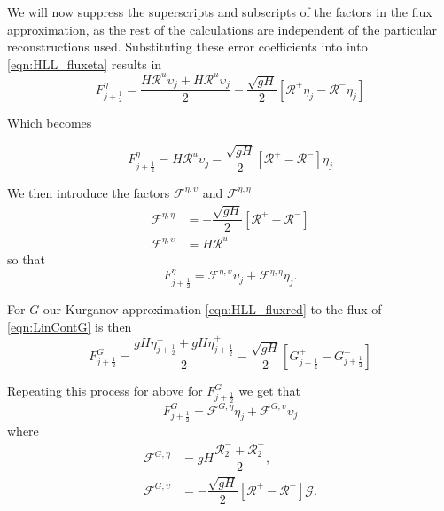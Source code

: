 We will now suppress the superscripts and subscripts of the factors in the flux approximation, as the rest of the calculations are independent of the particular reconstructions used. Substituting these error coefficients into into \eqref{eqn:HLL_fluxeta} results in
\begin{equation*}
F^{\eta}_{j+\frac{1}{2}} = \dfrac{ H  \mathcal{R}^u \upsilon_{j}+ H\mathcal{R}^u \upsilon_{j}}{ 2}  - \dfrac{ \sqrt{gH}}{ 2} \left [  \mathcal{R}^+ {\eta}_j -  \mathcal{R}^-{\eta}_j \right ]
\end{equation*}

Which becomes

\begin{equation*}
F^{\eta}_{j+\frac{1}{2}} = H \mathcal{R}^u \upsilon_{j}   - \dfrac{ \sqrt{gH}}{ 2} \left [  \mathcal{R}^+ -  \mathcal{R}^- \right ] {\eta}_j
\end{equation*}

We then introduce the factors $\mathcal{F}^{\eta,\upsilon}$ and $\mathcal{F}^{\eta,\eta}$
\begin{align}
\label{eqn:FluxFactorsh}
\mathcal{F}^{\eta,\eta} & = - \dfrac{ \sqrt{gH}}{ 2} \left [  \mathcal{R}^+ -  \mathcal{R}^- \right ]\\
\mathcal{F}^{\eta,\upsilon} & = H \mathcal{R}^u
\end{align}
so that
\begin{equation}
\label{eqn:etafluxapprox}
F^{\eta}_{j+\frac{1}{2}} = \mathcal{F}^{\eta,\upsilon} \upsilon_{j}   +  \mathcal{F}^{\eta,\eta} {\eta}_j.
\end{equation}


For $G$ our Kurganov approximation \eqref{eqn:HLL_fluxred} to the flux of \eqref{eqn:LinContG} is then
\begin{equation*}
F^{G}_{j+\frac{1}{2}} = \dfrac{ gH \eta ^-_{j+\frac{1}{2}}+ gH \eta ^+_{j+\frac{1}{2}}}{ 2}  - \dfrac{ \sqrt{gH}}{ 2} \left [ G^+_{j+\frac{1}{2}} - G^-_{j+\frac{1}{2}} \right ]
\end{equation*}

Repeating this process for above for $F^{G}_{j+\frac{1}{2}}$ we get that
\begin{equation}
\label{eqn:Gfluxapprox}
F^{G}_{j+\frac{1}{2}} =  \mathcal{F}^{G,\eta} \eta_{j}  + \mathcal{F}^{G,\upsilon} \upsilon_j
\end{equation}
where
\begin{align}
\label{eqn:FluxFactorsG}
\mathcal{F}^{G,\eta} & = gH \dfrac{\mathcal{R}^-_2 + \mathcal{R}^+_2 }{ 2}, \\
\mathcal{F}^{G,\upsilon} & = - \dfrac{ \sqrt{gH}}{ 2} \left [  \mathcal{R}^+ -  \mathcal{R}^- \right ] \mathcal{G}.
\end{align}


